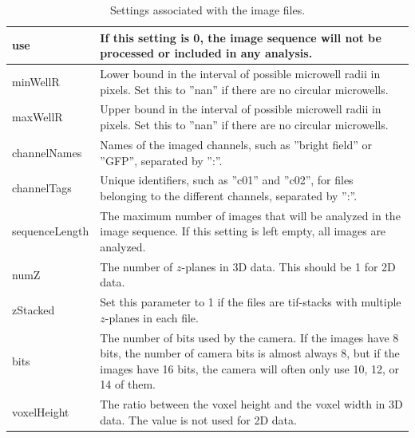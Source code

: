 \documentclass[a4paper, oneside, onecolumn, 11pt]{article}
\newcommand{\setting}[1]{''#1''}
\begin{document}
\begin{table}[!htb]
\caption{Settings associated with the image files.}
\label{tab:image-settings}
\begin{tabularx}{\textwidth}{lX}
\hline
use & If this setting is 0, the image sequence will not be processed or included in any analysis. \\[5pt] \hline

minWellR & Lower bound in the interval of possible microwell radii in pixels. Set this to \setting{nan} if there are no circular microwells. \\[5pt] \hline

maxWellR & Upper bound in the interval of possible microwell radii in pixels. Set this to \setting{nan} if there are no circular microwells. \\[5pt] \hline

channelNames & Names of the imaged channels, such as \setting{bright field} or \setting{GFP}, separated by \setting{:}. \\[5pt] \hline

channelTags & Unique identifiers, such as \setting{c01} and \setting{c02}, for files belonging to the different channels, separated by \setting{:}. \\[5pt] \hline

sequenceLength & The maximum number of images that will be analyzed in the image sequence. If this setting is left empty, all images are analyzed. \\[5pt] \hline

numZ & The number of $z$-planes in 3D data. This should be 1 for 2D data. \\[5pt] \hline

zStacked & Set this parameter to 1 if the files are tif-stacks with multiple $z$-planes in each file. \\[5pt] \hline

bits & The number of bits used by the camera. If the images have 8 bits, the number of camera bits is almost always 8, but if the images have 16 bits, the camera will often only use 10, 12, or 14 of them. \\[5pt] \hline

voxelHeight & The ratio between the voxel height and the voxel width in 3D data. The value is not used for 2D data. \\[5pt] \hline
\end{tabularx}
\end{table}
\end{document}
